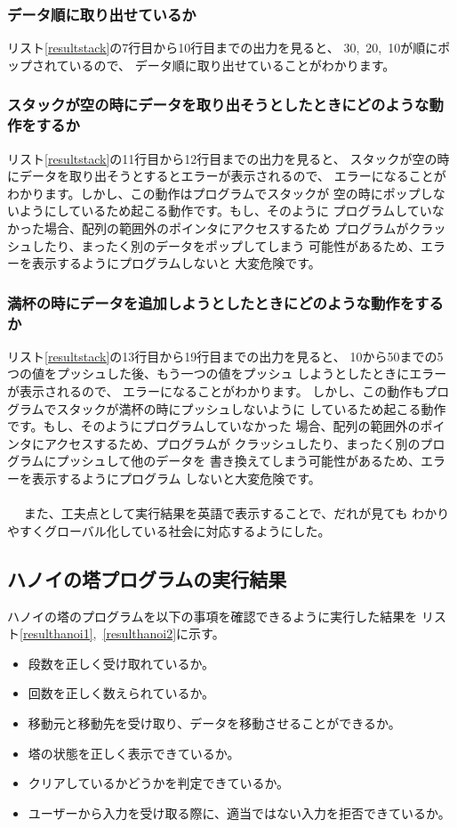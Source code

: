 \documentclass[a4j]{jarticle}
\begin{document}
\subsubsection{データ順に取り出せているか}
リスト\ref{resultstack}の7行目から10行目までの出力を見ると、
30,~20,~10が順にポップされているので、
データ順に取り出せていることがわかります。
\subsubsection{スタックが空の時にデータを取り出そうとしたときにどのような動作をするか}
リスト\ref{resultstack}の11行目から12行目までの出力を見ると、
スタックが空の時にデータを取り出そうとするとエラーが表示されるので、
エラーになることがわかります。しかし、この動作はプログラムでスタックが
空の時にポップしないようにしているため起こる動作です。もし、そのように
プログラムしていなかった場合、配列の範囲外のポインタにアクセスするため
プログラムがクラッシュしたり、まったく別のデータをポップしてしまう
可能性があるため、エラーを表示するようにプログラムしないと
大変危険です。
\subsubsection{満杯の時にデータを追加しようとしたときにどのような動作をするか}
リスト\ref{resultstack}の13行目から19行目までの出力を見ると、
10から50までの5つの値をプッシュした後、もう一つの値をプッシュ
しようとしたときにエラーが表示されるので、
エラーになることがわかります。
しかし、この動作もプログラムでスタックが満杯の時にプッシュしないように
しているため起こる動作です。もし、そのようにプログラムしていなかった
場合、配列の範囲外のポインタにアクセスするため、プログラムが
クラッシュしたり、まったく別のプログラムにプッシュして他のデータを
書き換えてしまう可能性があるため、エラーを表示するようにプログラム
しないと大変危険です。
\\\\~~
また、工夫点として実行結果を英語で表示することで、だれが見ても
わかりやすくグローバル化している社会に対応するようにした。
\subsection{ハノイの塔プログラムの実行結果}
\label{sec:hanoiresult}
ハノイの塔のプログラムを以下の事項を確認できるように実行した結果を
リスト\ref{resulthanoi1},~\ref{resulthanoi2}に示す。
\begin{itemize}
  \item 段数を正しく受け取れているか。
  \item 回数を正しく数えられているか。
  \item 移動元と移動先を受け取り、データを移動させることができるか。
  \item 塔の状態を正しく表示できているか。
  \item クリアしているかどうかを判定できているか。
  \item ユーザーから入力を受け取る際に、適当ではない入力を拒否できているか。
\end{itemize}
\end{document}
